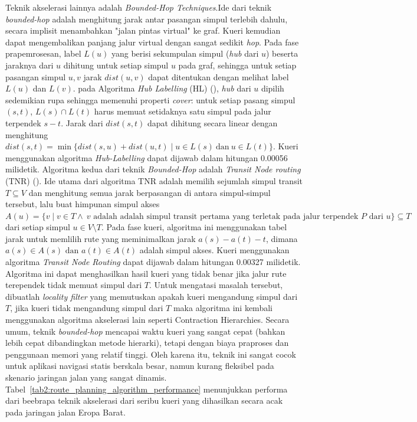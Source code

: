 Teknik akselerasi lainnya adalah \textit{Bounded-Hop Techniques}.Ide dari teknik \textit{bounded-hop} adalah menghitung jarak antar pasangan simpul terlebih dahulu, secara implisit menambahkan "jalan pintas virtual" ke graf. Kueri kemudian dapat mengembalikan panjang jalur virtual dengan sangat sedikit \textit{hop}. Pada fase prapemrosesan, label $L(u)$ yang berisi sekumpulan simpul (\textit{hub} dari $u$) beserta jaraknya dari $u$ dihitung untuk setiap simpul $u$ pada graf, sehingga untuk setiap pasangan simpul $u,v$ jarak $dist(u,v)$ dapat ditentukan dengan melihat label $L(u)$ dan $L(v)$. pada Algoritma \textit{Hub Labelling} (HL) (\cite{Abraham2011}), \textit{hub} dari $u$ dipilih sedemikian rupa sehingga memenuhi properti \textit{cover}: untuk setiap pasang simpul $(s,t)$, $L(s)\cap L(t)$ harus memuat setidaknya satu simpul pada jalur terpendek $s-t$. Jarak dari $dist(s,t)$ dapat dihitung secara linear dengan menghitung $dist(s,t) = \min \{ dist(s,u) + dist(u,t) \mid u \in L(s) \ \text{dan} \ u \in L(t) \}$. Kueri menggunakan algoritma \textit{Hub-Labelling} dapat dijawab dalam hitungan 0.00056 milidetik. Algoritma kedua dari teknik \textit{Bounded-Hop} adalah \textit{Transit Node routing} (TNR) (\cite{Arz2013}). Ide utama dari algoritma TNR adalah memilih sejumlah simpul transit $T\subseteq V$ dan menghitung semua jarak berpasangan di antara simpul-simpul tersebut, lalu buat himpunan simpul akses $A(u)=\{v \mid v\in T \land \  v \text{ adalah adalah simpul transit pertama yang terletak pada jalur terpendek } P \text{ dari } u  \}  \subseteq T$ dari setiap simpul $u \in V \setminus T$. Pada fase kueri, algoritma ini menggunakan tabel jarak untuk memlilih rute yang meminimalkan jarak $a(s)-a(t)-t$, dimana $a(s)\in A(s) \text{ dan } a(t) \in A(t)$ adalah simpul akses. Kueri menggunakan algoritma \textit{Transit Node Routing} dapat dijawab dalam hitungan 0.00327 milidetik. Algoritma ini dapat menghasilkan hasil kueri yang tidak benar jika jalur rute terependek tidak memuat simpul dari $T$. Untuk mengatasi masalah tersebut, dibuatlah \textit{locality filter} yang memutuskan apakah kueri mengandung simpul dari $T$, jika kueri tidak mengandung simpul dari $T$ maka algoritma ini kembali menggunakan algoritma akselerasi lain seperti Contraction Hierarchies. Secara umum, teknik \textit{bounded-hop} mencapai waktu kueri yang sangat cepat (bahkan lebih cepat dibandingkan metode hierarki), tetapi dengan biaya praproses dan penggunaan memori yang relatif tinggi. Oleh karena itu, teknik ini sangat cocok untuk aplikasi navigasi statis berskala besar, namun kurang fleksibel pada skenario jaringan jalan yang sangat dinamis. Tabel~\ref{tab2:route_planning_algorithm_performance} menunjukkan performa dari beebrapa teknik akselerasi dari seribu kueri yang dihasilkan secara acak pada jaringan jalan Eropa Barat.


